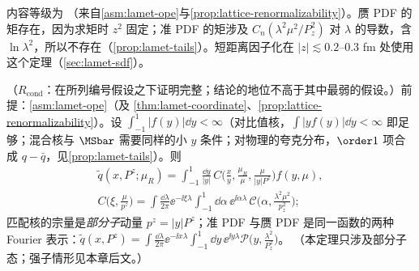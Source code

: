 内容等级为 \tagA（来自\cref{asm:lamet-ope}与\cref{prop:lattice-renormalizability}）。赝 PDF 的矩存在，因为求矩时 $z^2$ 固定；准 PDF 的矩涉及 $C_n(\lambda^2\mu^2/P_z^2)$ 对 $\lambda$ 的导数，含 $\ln\lambda^2$，所以不存在（\cref{prop:lamet-tails}）。短距离因子化在 $|z|\lesssim0.2$--$0.3$ fm 处使用这个定理（\cref{sec:lamet-sdf}）。

\begin{theorem}\label{thm:lamet-parton-momentum}
（$R_{\mathrm{cond}}$：在所列编号假设之下证明完整；结论的地位不高于其中最弱的假设。）前提：\cref{asm:lamet-ope}（及 \cref{thm:lamet-coordinate}、\cref{prop:lattice-renormalizability}）。设 $\int_{-1}^1|f(y)|\dd y<\infty$（对比值核，$\int|yf(y)|\dd y<\infty$ 即足够；混合核与 $\MSbar$ 需要同样的小 $y$ 条件；对物理的夸克分布，$\order1$ 项合成 $q-\bar q$，见\cref{prop:lamet-tails}）。则
\begin{equation}\label{eq:lamet-mom-fact}
\begin{gathered}
\tilde q(x,P^z;\mu_R)=\int_{-1}^1\frac{\dd y}{|y|}\,C\Big(\frac xy,\frac{\mu_R}\mu,\frac\mu{|y|P^z}\Big)f(y,\mu),\\
C\Big(\xi,\frac\mu{p^z}\Big)=\int\frac{\dd\lambda}{2\pi}\ee^{-\ii\xi\lambda}\int_{-1}^1\dd\alpha\,\ee^{\ii\alpha\lambda}\,\mathcal C\Big(\alpha,\frac{\lambda^2\mu^2}{p_z^2}\Big);
\end{gathered}
\end{equation}%
匹配核的宗量是\emph{部分子}动量 $p^z=|y|P^z$；准 PDF 与赝 PDF 是同一函数的两种 Fourier 表示：$\tilde q(x,P^z)=\int\frac{\dd\lambda}{2\pi}\ee^{-\ii x\lambda}\int_{-1}^1\dd y\,\ee^{\ii y\lambda}\mathcal P\big(y,\frac{\lambda^2}{P_z^2}\big)$。
（本定理只涉及部分子态；强子情形见本章后文。）
\end{theorem}

